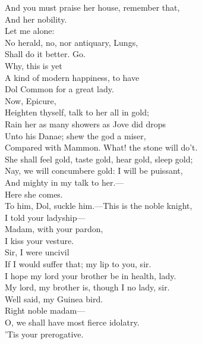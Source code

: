 \documentclass[a4paper,oneside]{memoir}
\begin{document}
\begin{drama*}
\facespeaks And you must praise her house, remember that,\\
And her nobility.\\
\mammonspeaks {} Let me alone:\\
No herald, no, nor antiquary, Lungs,\\
Shall do it better. Go.\\
\facespeaks {} Why, this is yet\\
A kind of modern happiness, to have\\
Dol Common for a great lady.\\
\mammonspeaks {} Now, Epicure,\\
Heighten thyself, talk to her all in gold;\\
Rain her as many showers as Jove did drops\\
Unto his Danae; shew the god a miser,\\
Compared with Mammon. What! the stone will do't.\\
She shall feel gold, taste gold, hear gold, sleep gold;\\
Nay, we will concumbere gold: I will be puissant,\\
And mighty in my talk to her.---\\
Here she comes.\\
\facespeaks {} To him, Dol, suckle him.---This is the noble knight,\\
I told your ladyship---\\
\mammonspeaks {} Madam, with your pardon,\\
I kiss your vesture.\\
\dolspeaks {} Sir, I were uncivil\\
If I would suffer that; my lip to you, sir.\\
\mammonspeaks I hope my lord your brother be in health, lady.\\
\dolspeaks My lord, my brother is, though I no lady, sir.\\
\facespeaks {} Well said, my Guinea bird.\\
\mammonspeaks Right noble madam---\\
\facespeaks {} O, we shall have most fierce idolatry.\\
\mammonspeaks {} 'Tis your prerogative.\\

\end{drama*}
\end{document}
